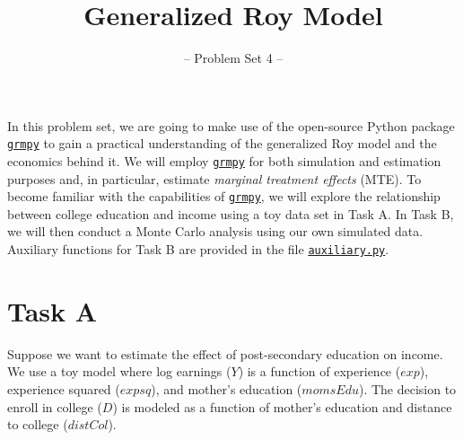 

\title{Generalized Roy Model}
\subtitle{-- Problem Set 4 --}
\date{}

\maketitle\vspace{-2cm}

In this problem set, we are going to make use of the open-source Python package \href{https://grmpy.readthedocs.io/en/latest/}{\texttt{grmpy}} to gain a practical understanding of the generalized Roy model and the economics behind it. We will employ \href{https://grmpy.readthedocs.io/en/latest/}{\texttt{grmpy}} for both simulation and estimation purposes and, in particular, estimate \emph{marginal treatment effects} (MTE). To become familiar with the capabilities of \href{https://grmpy.readthedocs.io/en/latest/}{\texttt{grmpy}}, we will explore the relationship between college education and income using a toy data set in Task A. 
In Task B, we will then conduct a Monte Carlo analysis using our own simulated data. Auxiliary functions for Task B are provided in the file \href{https://github.com/HumanCapitalAnalysis/microeconometrics/blob/prset_grmpy/problem-sets/04-generalized-roy-model/sources/auxiliary.py}{\texttt{auxiliary.py}}.

\section*{Task A} 

Suppose we want to estimate the effect of post-secondary education on income. We use a toy model where log earnings ($Y$) is a function of experience ($exp$), experience squared ($expsq$), and mother's education ($momsEdu$). The decision to enroll in college ($D$) is modeled as a function of mother's education and distance to college ($distCol$).


